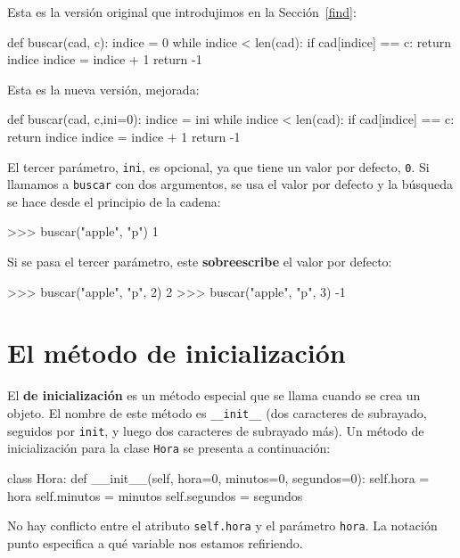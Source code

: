 Esta es la versión original que introdujimos en la Sección~\ref{find}:

\pagebreak{}

\begin{pythoncode}
def buscar(cad, c):
  indice = 0
  while indice < len(cad):
    if cad[indice] == c:
      return indice
    indice = indice + 1
  return -1
\end{pythoncode}
 Esta es la nueva versión, mejorada:
\begin{pythoncode}
def buscar(cad, c,ini=0):
  indice = ini
  while indice < len(cad):
    if cad[indice] == c:
      return indice
    indice = indice + 1
  return -1
\end{pythoncode}

El tercer parámetro, \texttt{ini}, es opcional, ya que tiene un valor
por defecto, \texttt{0}. Si llamamos a \texttt{buscar} con dos argumentos,
se usa el valor por defecto y la búsqueda se hace desde el principio
de la cadena:
\begin{pyconcode}
>>> buscar("apple", "p")
1
\end{pyconcode}

Si se pasa el tercer parámetro, este \textbf{sobreescribe} el valor
por defecto:
\begin{pyconcode}
>>> buscar("apple", "p", 2)
2
>>> buscar("apple", "p", 3)
-1
\end{pyconcode}

\section{El método de inicialización}

 

El \textbf{de inicialización} es un método especial que se llama cuando
se crea un objeto. El nombre de este método es \texttt{\_\_init\_\_}
(dos caracteres de subrayado, seguidos por \texttt{init}, y luego
dos caracteres de subrayado más). Un método de inicialización para
la clase \texttt{Hora} se presenta a continuación:
\begin{pythoncode}
class Hora:
  def __init__(self, hora=0, minutos=0, segundos=0):
    self.hora = hora
    self.minutos = minutos
    self.segundos = segundos
\end{pythoncode}

No hay conflicto entre el atributo \texttt{self.hora} y el parámetro
\texttt{hora}. La notación punto especifica a qué variable nos estamos
refiriendo.

